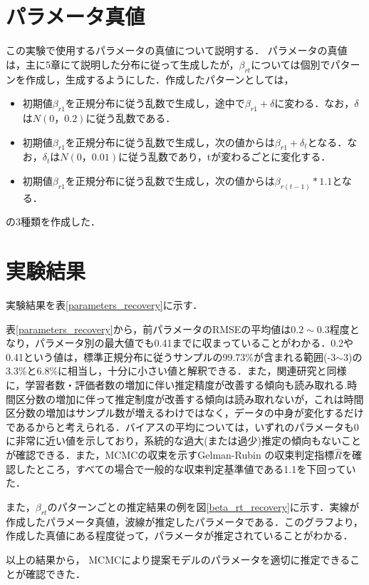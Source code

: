 \documentclass[a4paper,11pt,oneside,openany]{jsbook}
\begin{document}
\section{パラメータ真値}
この実験で使用するパラメータの真値について説明する．
パラメータの真値は，主に5章にて説明した分布に従って生成したが，$\beta_{rt}$については個別でパターンを作成し，生成するようにした．作成したパターンとしては，
\begin{itemize}
\item 初期値$\beta_{r1}$を正規分布に従う乱数で生成し，途中で$\beta_{r1}+\delta$に変わる．なお，$\delta$は$N(0，0.2)$に従う乱数である．
\item 初期値$\beta_{r1}$を正規分布に従う乱数で生成し，次の値からは$\beta_{r1}+\delta_t$となる．なお，$\delta_t$は$N(0，0.01)$に従う乱数であり，tが変わるごとに変化する．
\item 初期値$\beta_{r1}$を正規分布に従う乱数で生成し，次の値からは$\beta_{r(t-1)}*1.1$となる．
\end{itemize}
の3種類を作成した．
\section{実験結果}
実験結果を表\ref{parameters_recovery}に示す．

表\ref{parameters_recovery}から，前パラメータのRMSEの平均値は$0.2\sim0.3$程度となり，パラメータ別の最大値でも0.41までに収まっていることがわかる．0.2や0.41という値は，標準正規分布に従うサンプルの99.73\%が含まれる範囲(-3$\sim$3)の3.3\%と6.8\%に相当し，十分に小さい値と解釈できる．また，関連研究と同様に，学習者数・評価者数の増加に伴い推定精度が改善する傾向も読み取れる.時間区分数の増加に伴って推定制度が改善する傾向は読み取れないが，これは時間区分数の増加はサンプル数が増えるわけではなく，データの中身が変化するだけであるからと考えられる．バイアスの平均については，いずれのパラメータも0に非常に近い値を示しており，系統的な過大(または過少)推定の傾向もないことが確認できる．また，MCMCの収束を示すGelman-Rubin の収束判定指標$ \hat{R} $\cite{RhatRubin,RhatCarlin}を確認したところ，すべての場合で一般的な収束判定基準値である1.1を下回っていた．

また，$\beta_{rt}$のパターンごとの推定結果の例を図\ref{beta_rt_recovery}に示す．実線が作成したパラメータ真値，波線が推定したパラメータである．このグラフより，作成した真値にある程度従って，パラメータが推定されていることがわかる．

以上の結果から， MCMCにより提案モデルのパラメータを適切に推定できることが確認できた．
\end{document}
